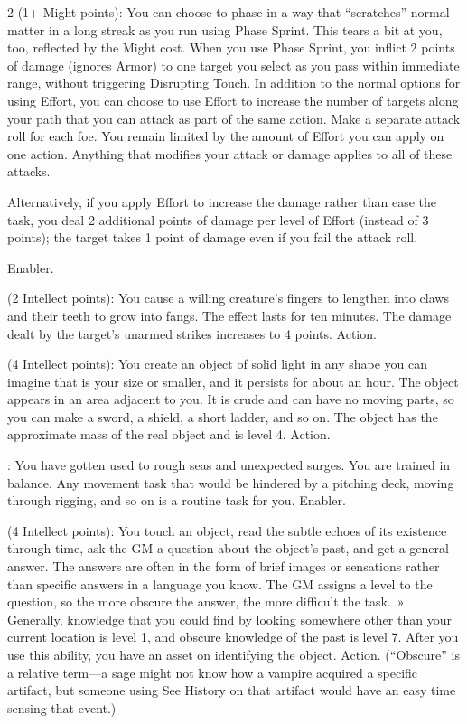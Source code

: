 \begin{multicols}{2}
 (1+ Might points): You can choose to phase in a way that “scratches” normal matter in a long streak as you run using Phase Sprint. This tears a bit at you, too, reflected by the Might cost. When you use Phase Sprint, you inflict 2 points of damage (ignores Armor) to one target you select as you pass within immediate range, without triggering Disrupting Touch. In addition to the normal options for using Effort, you can choose to use Effort to increase the number of targets along your path that you can attack as part of the same action. Make a separate attack roll for each foe. You remain limited by the amount of Effort you can apply on one action. Anything that modifies your attack or damage applies to all of these attacks. 

Alternatively, if you apply Effort to increase the damage rather than ease the task, you deal 2 additional points of damage per level of Effort (instead of 3 points); the target takes 1 point of damage even if you fail the attack roll. 

Enabler. 
 
 (2 Intellect points): You cause a willing creature’s fingers to lengthen into claws and their teeth to grow into fangs. The effect lasts for ten minutes. The damage dealt by the target’s unarmed strikes increases to 4 points. Action. 
 
 (4 Intellect points): You create an object of solid light in any shape you can imagine that is your size or smaller, and it persists for about an hour. The object appears in an area adjacent to you. It is crude and can have no moving parts, so you can make a sword, a shield, a short ladder, and so on. The object has the approximate mass of the real object and is level 4. Action. 
 
: You have gotten used to rough seas and unexpected surges. You are trained in balance. Any movement task that would be hindered by a pitching deck, moving through rigging, and so on is a routine task for you. Enabler. 
 
 (4 Intellect points): You touch an object, read the subtle echoes of its existence through time, ask the GM a question about the object’s past, and get a general answer. The answers are often in the form of brief images or sensations rather than specific answers in a language you know. The GM assigns a level to the question, so the more obscure the answer, the more difficult the task. » Generally, knowledge that you could find by looking somewhere other than your current location is level 1, and obscure knowledge of the past is level 7. After you use this ability, you have an asset on identifying the object. Action. (“Obscure” is a relative term—a sage might not know how a vampire acquired a specific artifact, but someone using See History on that artifact would have an easy time sensing that event.)
 

\end{multicols}
